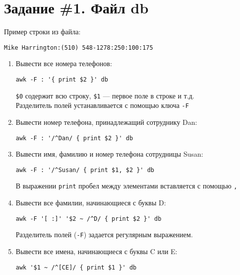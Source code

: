 \documentclass[listings]{labreport}
\begin{document}
\maketitlepage

\section*{Задание \#1. Файл db}

\noindent Пример строки из файла:
\begin{verbatim}
Mike Harrington:(510) 548-1278:250:100:175
\end{verbatim}

\begin{enumerate}
\item Вывести все номера телефонов:
\begin{verbatim}
awk -F : '{ print $2 }' db
\end{verbatim}

\begin{small}
  \verb|$0| содержит всю строку, \verb|$1| — первое поле в строке и т.д.\\
  Разделитель полей устанавливается с помощью ключа \verb|-F|
\end{small}

\item Вывести номер телефона, принадлежащий сотруднику Dan:
\begin{verbatim}
awk -F : '/^Dan/ { print $2 }' db
\end{verbatim}

\item Вывести имя, фамилию и номер телефона сотрудницы Susan:
\begin{verbatim}
awk -F : '/^Susan/ { print $1, $2 }' db
\end{verbatim}

\begin{small}
  В выражении \verb|print| пробел между элементами вставляется с помощью \verb|,|
\end{small}

\item Вывести все фамилии, начинающиеся с буквы D:
\begin{verbatim}
awk -F '[ :]' '$2 ~ /^D/ { print $2 }' db
\end{verbatim}

\begin{small}
  Разделитель полей (\verb|-F|) задается регулярным выражением.
\end{small}

\item Вывести все имена, начинающиеся с буквы C или E:
\begin{verbatim}
awk '$1 ~ /^[CE]/ { print $1 }' db
\end{verbatim}


\end{enumerate}
\end{document}
